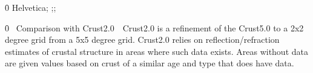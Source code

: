 {\mac{}
{\fonttbl\f0\fswiss{} Helvetica;}
{;;}
\pard{}\ql\qnatural

\f0  \
Comparison with Crust2.0\
\
Crust2.0 is a refinement of the Crust5.0 to a 2x2 degree grid from a 5x5 degree grid. Crust2.0 relies on reflection/refraction estimates of crustal structure in areas where such data exists. Areas without data are given values based on crust of a similar age and type that does have data. \
\
}